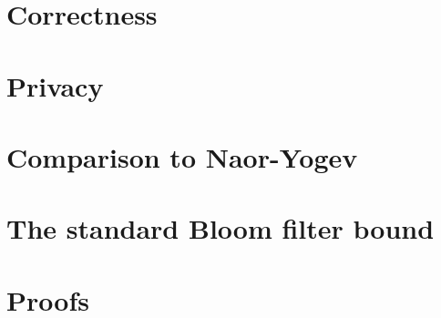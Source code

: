\documentclass[11pt, pdftex]{article}
\begin{document}
\section{Correctness}


\section{Privacy}






\newpage

\begin{appendix}
  \section{Comparison to Naor-Yogev}
  

  \section{The standard Bloom filter bound}
  

  \section{Proofs}
  
\end{appendix}


%
\end{document}
